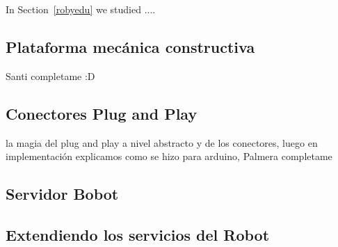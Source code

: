 In Section~\ref{robyedu} we studied .... 

\subsection{Plataforma mec\'anica constructiva}
\label{pmc}

Santi completame :D

\subsection{Conectores Plug and Play}                                                                                                          
\label{cp&p}  

la magia del plug and play a nivel abstracto y de los conectores, luego en implementaci\'on explicamos como se hizo para arduino, Palmera completame

\subsection{Servidor Bobot}
\label{servbobot}


\subsection{Extendiendo los servicios del Robot}
\label{drivers}


